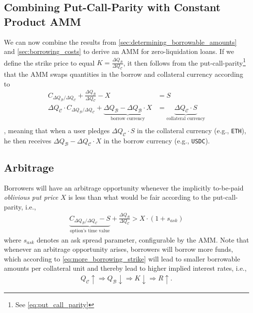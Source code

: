 \documentclass[a4paper]{article}
\begin{document}
\subsection{Combining Put-Call-Parity with Constant Product AMM}
\label{sec:combining_put_call_parity_with_AMM}
We can now combine the results from \cref{sec:determining_borrowable_amounts} and \cref{sec:borrowing_costs} to derive an AMM for zero-liquidation loans. If we define the strike price to equal $K=\frac{\Delta Q_\mathcal{B}}{\Delta Q_\mathcal{C}}$, it then follows from the put-call-parity\footnote{See \cref{eq:put_call_parity}} that the AMM swaps quantities in the borrow and collateral currency according to
\begin{equation}
\begin{split}
C_{\Delta Q_{\mathcal{B}}/\Delta Q_\mathcal{C}} + \frac{\Delta Q_{\mathcal{B}}}{\Delta Q_{\mathcal{C}}} - X &= S \\
\Delta Q_\mathcal{C} \cdot C_{\Delta Q_{\mathcal{B}}/\Delta Q_\mathcal{C}} + \underbrace{\Delta Q_\mathcal{B} - \Delta Q_\mathcal{B} \cdot  X}_{\textrm{borrow currency}} &= \underbrace{\Delta Q_\mathcal{C} \cdot  S}_{\textrm{collateral currency}} \\
\end{split}
\end{equation}
, meaning that when a user pledges $\Delta Q_\mathcal{C} \cdot S$ in the collateral currency (e.g., \verb|ETH|), he then receives $\Delta Q_\mathcal{B} - \Delta Q_\mathcal{C} \cdot X$ in the borrow currency (e.g., \verb|USDC|).

\subsection{Arbitrage}
\label{sec:arbitrage}
Borrowers will have an arbitrage opportunity whenever the implicitly to-be-paid \emph{oblivious put price} $X$ is less than what would be fair according to the put-call-parity, i.e.,
\begin{equation}
\begin{split}
\label{eq:arbitrage_borrowers}
\underbrace{C_{\Delta Q_\mathcal{B} / \Delta Q_\mathcal{C}} - S}_{\textrm{option's time value}} + \frac{\Delta Q_\mathcal{B}}{\Delta Q_\mathcal{C}} > X \cdot (1+s_{ask})
\end{split}
\end{equation}
where $s_{ask}$ denotes an ask spread parameter, configurable by the AMM. Note that whenever an arbitrage opportunity arises, borrowers will borrow more funds, which according to \cref{eq:more_borrowing_strike} will lead to smaller borrowable amounts per collateral unit and thereby lead to higher implied interest rates, i.e.,
\begin{equation}
\begin{split}
Q_\mathcal{C}\uparrow \Rightarrow Q_\mathcal{B}\downarrow \Rightarrow K\downarrow \Rightarrow R\uparrow.
\end{split}
\end{equation}
\end{document}
